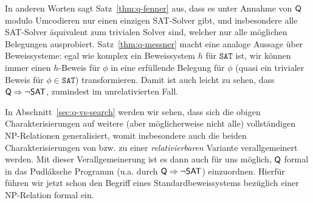 In anderen Worten sagt Satz~\ref{thm:q-fenner} aus, dass es unter Annahme von $\mathsf{Q}$ modulo Umcodieren nur einen einzigen SAT-Solver gibt, und insbesondere alle SAT-Solver äquivalent zum trivialen Solver sind, welcher nur alle möglichen Belegungen ausprobiert.
Satz~\ref{thm:q-messner} macht eine analoge Aussage über Beweissysteme: egal wie komplex ein Beweissystem $h$ für $\mathtt{SAT}$ ist, wir können immer einen $h$-Beweis für $\phi$ in eine erfüllende Belegung für $\phi$ (quasi ein trivialer Beweis für $\phi\in\mathtt{SAT}$) transformieren. Damit ist auch leicht zu sehen, dass $\mathsf{Q}\Rightarrow \neg\mathsf{SAT}$, zumindest im unrelativierten Fall.

In Abschnitt~\ref{sec:q-vs-search} werden wir sehen, dass sich die obigen Charakterisierungen auf weitere (aber möglicherweise nicht alle) vollständigen NP-Relationen generalisiert, womit insbesondere auch die beiden Charakterisierungen von \citeauthor{fenner_inverting_2003} bzw. \citeauthor{kobler_is_2000} zu einer \emph{relativierbaren} Variante verallgemeinert werden.
Mit dieser Verallgemeinerung ist es dann auch für uns möglich, $\mathsf{Q}$ formal in das Pudláksche Programm (u.a. durch $\mathsf{Q}\Rightarrow \neg\mathsf{SAT}$) einzuordnen. Hierfür führen wir jetzt schon den Begriff eines Standardbeweissystems bezüglich einer NP-Relation formal ein.

